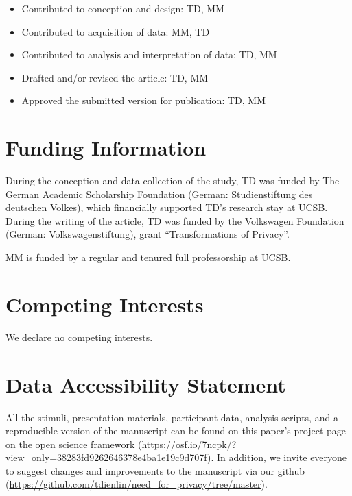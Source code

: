 \documentclass[man,floatsintext]{apa6}
\providecommand{\tightlist}{%
  \setlength{\itemsep}{0pt}\setlength{\parskip}{0pt}}
\begin{document}
\begin{itemize}
\tightlist
\item
  Contributed to conception and design: TD, MM
\item
  Contributed to acquisition of data: MM, TD
\item
  Contributed to analysis and interpretation of data: TD, MM
\item
  Drafted and/or revised the article: TD, MM
\item
  Approved the submitted version for publication: TD, MM
\end{itemize}

\hypertarget{funding-information}{%
\section{Funding Information}\label{funding-information}}

During the conception and data collection of the study, TD was funded by The German Academic Scholarship Foundation (German: Studienstiftung des deutschen Volkes), which financially supported TD's research stay at UCSB. During the writing of the article, TD was funded by the Volkswagen Foundation (German: Volkswagenstiftung), grant \enquote{Transformations of Privacy}.

MM is funded by a regular and tenured full professorship at UCSB.

\hypertarget{competing-interests}{%
\section{Competing Interests}\label{competing-interests}}

We declare no competing interests.

\hypertarget{data-accessibility-statement}{%
\section{Data Accessibility Statement}\label{data-accessibility-statement}}

All the stimuli, presentation materials, participant data, analysis scripts, and a reproducible version of the manuscript can be found on this paper's project page on the open science framework (\url{https://osf.io/7ncpk/?view_only=38283fd9262646378e4ba1e19c9d707f}). In addition, we invite everyone to suggest changes and improvements to the manuscript via our github (\url{https://github.com/tdienlin/need_for_privacy/tree/master}).
\end{document}
